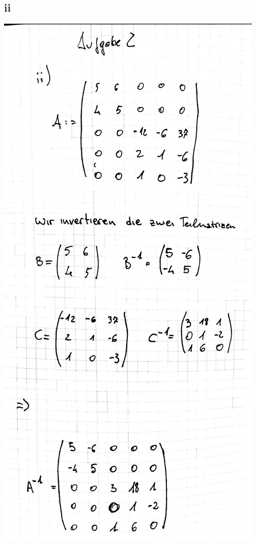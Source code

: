 \documentclass[12pt,a4paper]{article}
\begin{document}
\subsection{ii}
\includegraphics[scale=0.2]{lat4d_1.jpg} 
\newpage
\end{document}
